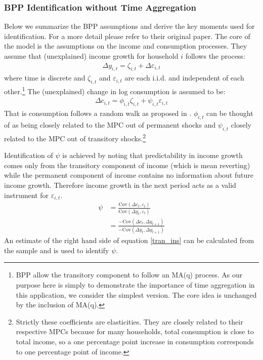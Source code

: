 \documentclass[titlepage]{\econtex}\newcommand{\texname}{IncomeUncertainty}
\begin{document}
\subsubsection{BPP Identification without Time Aggregation} \label{BPP_noagg}
Below we summarize the BPP assumptions and derive the key moments used for identification. For a more detail please refer to their original paper. The core of the model is the assumptions on the income and consumption processes. They assume that (unexplained) income growth for household $i$ follows the process:
\begin{align*}
\Delta y_{i,t} = \zeta_{i,t} + \Delta \varepsilon_{i,t}
\end{align*}
where time is discrete and $\zeta_{i,t}$ and $\varepsilon_{i,t}$ are each i.i.d. and independent of each other.\footnote{BPP allow the transitory component to follow an MA(q) process. As our purpose here is simply to demonstrate the importance of time aggregation in this application, we consider the simplest version. The core idea is unchanged by the inclusion of MA(q).} The (unexplained) change in log consumption is assumed to be:
\begin{align*}
\Delta c_{i,t} = \phi_{i,t}\zeta_{i,t} + \psi_{i,t} \varepsilon_{i,t}
\end{align*}
That is consumption follows a random walk as proposed in \cite{hall_stochastic_1978}. $\phi_{i,t}$ can be thought of as being closely related to the MPC out of permanent shocks and $\psi_{i,t}$ closely related to the MPC out of transitory shocks.\footnote{Strictly these coefficients are elasticities. They are closely related to their respective MPCs because for many households, total consumption is close to total income, so a one percentage point increase in consumption corresponds to one percentage point of income.}

Identification of $\psi$ is achieved by noting that predictability in income growth comes only from the transitory component of income (which is mean reverting) while the permanent component of income contains no information about future income growth. Therefore income growth in the next period acts as a valid instrument for $\varepsilon_{i,t}$.
\begin{align}
\psi &= \frac{\mathrm{Cov}(\Delta c_t,\varepsilon_t)}{\mathrm{Cov}(\Delta y_t,\varepsilon_t)} \nonumber \\
&= \frac{-\mathrm{Cov}(\Delta c_t,\Delta y_{t+1})}{-\mathrm{Cov}(\Delta y_t,\Delta y_{t+1})} \label{tran_ins}
\end{align}
An estimate of the right hand side of equation \ref{tran_ins} can be calculated from the sample and is used to identify $\psi$.
\end{document}

